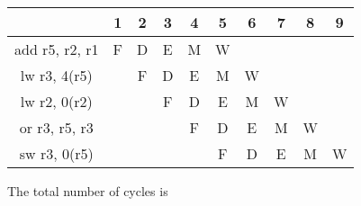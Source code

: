 \documentclass[12pt]{article}
\begin{document}
	\begin{center}
		\begin{tabular}{ |c|c|c|c|c|c|c|c|c|c| } 
			\hline
			& 1 & 2 & 3 & 4 & 5 & 6 & 7 & 8 & 9 \\
			\hline
			add r5, r2, r1 & F & D & E & M & W &  &  &  &   \\
			\hline
			lw r3, 4(r5) &  & F & D & E & M & W &  &  &   \\
			\hline
			lw r2, 0(r2) &  &  & F & D & E & M & W &  &   \\
			\hline
			or r3, r5, r3 &  &  &  & F & D & E & M & W &   \\
			\hline
			sw r3, 0(r5) &  &  &  &  & F & D & E & M & W  \\
			\hline
		\end{tabular}
		
		\vspace{0.2cm}
		
		The total number of cycles is  \vspace{0.4cm} \\
		
	\end{center}
	
	
	
	
\end{document}
